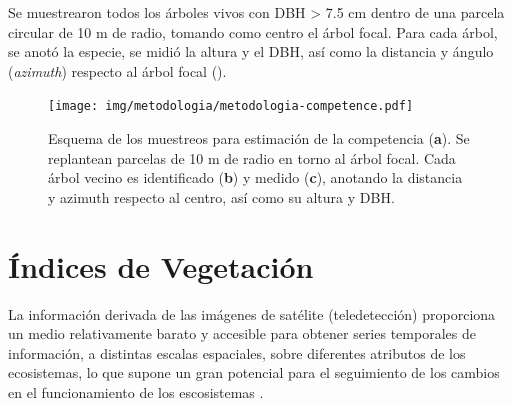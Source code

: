 Se muestrearon todos los árboles vivos con DBH \textgreater{} 7.5 cm dentro de una parcela circular de 10 m de radio, tomando como centro el árbol focal. Para cada árbol, se anotó la especie, se midió la altura y el DBH, así como la distancia y ángulo (\emph{azimuth}) respecto al árbol focal ().


\begin{figure}
	\centering
	\texttt{[image: img/metodologia/metodologia-competence.pdf]}
	\caption{
	Esquema de los muestreos para estimación de la competencia (\textbf{a}). Se replantean parcelas de 10 m de radio en torno al árbol focal. Cada árbol vecino es identificado (\textbf{b}) y medido (\textbf{c}), anotando la distancia y azimuth respecto al centro, así como su altura y DBH.}\label{fig:metodologia:competence}
\end{figure}

\section{Índices de Vegetación}\label{sec:metodologia:modis-iv}

La información derivada de las imágenes de satélite (teledetección) proporciona un medio relativamente barato y accesible para obtener series temporales de información, a distintas escalas espaciales, sobre
diferentes atributos de los ecosistemas, lo que supone un gran potencial para el seguimiento de los cambios en el funcionamiento de los escosistemas \autocites{Pettorellietal2014SatelliteRemote,Pettorellietal2018SatelliteRemote,Cabelloetal2012EcosystemFunctioning, Alcarazetal2006IdentificationCurrent,AlcarazSeguraetal2015CambiosProductividad}.

